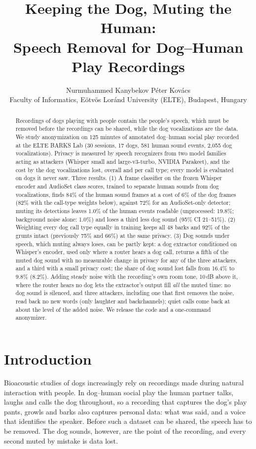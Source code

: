 \documentclass[10pt,twocolumn,a4paper]{article}
\title{Keeping the Dog, Muting the Human:\\ Speech Removal for Dog--Human Play Recordings}
\author{Nurmuhammed Kanybekov \quad Péter Kovács\\
\small Faculty of Informatics, Eötvös Loránd University (ELTE), Budapest, Hungary\\
\small \todo{draft of 23 October 2026 -- not for distribution; author list and order to be confirmed}}
\date{}
\begin{document}
\maketitle

\begin{abstract}
Recordings of dogs playing with people contain the people's speech, which must be removed before the
recordings can be shared, while the dog vocalizations are the data. We study anonymization on 125
minutes of annotated dog--human social play recorded at the ELTE BARKS Lab (30 sessions, 17 dogs, 581
human sound events, 2{,}055 dog vocalizations). Privacy is measured by speech recognizers from two model
families acting as attackers (Whisper small and large-v3-turbo, NVIDIA Parakeet), and the cost by the dog
vocalizations lost, overall and per call type; every model is evaluated on dogs it never saw. Three
results. (1) A frame classifier on the frozen Whisper encoder and AudioSet class scores, trained to
separate human sounds from dog vocalizations, finds 84\% of the human sound frames at a cost of 6\% of
the dog frames (82\% with the call-type weights below), against 72\% for an AudioSet-only detector; muting its detections leaves 1.0\% of the
human events readable (unprocessed: 19.8\%; background noise alone: 1.0\%) and loses a third less dog
sound (95\% CI 21--51\%). (2) Weighting every dog call type equally in training keeps all 48 barks and
92\% of the grunts intact (previously 75\% and 66\%) at the same privacy. (3) Dog sounds under speech,
which muting always loses, can be partly kept: a dog extractor conditioned on Whisper's encoder, used only
where a router hears a dog call, returns a fifth of the muted dog sound with no measurable change in
privacy for any of the three attackers, and a third with a small privacy cost; the share of dog sound lost
falls from 16.4\% to 9.8\% (8.2\%). Adding steady noise with the recording's own room tone, 10\,dB above it,
where the router hears no dog lets the extractor's output fill \emph{all} the muted time: no dog sound is
silenced, and three attackers, including one that first removes the noise, read back no new words (only
laughter and backchannels); quiet calls come back at about the level of the added noise. We release the
code and a one-command anonymizer.
\end{abstract}

\section{Introduction}
Bioacoustic studies of dogs increasingly rely on recordings made during natural interaction with
people. In dog--human social play the human partner talks, laughs and calls the dog throughout, so a
recording that captures the dog's play pants, growls and barks also captures personal data: what was
said, and a voice that identifies the speaker. Before such a dataset can be shared, the speech has to
be removed. The dog sounds, however, are the point of the recording, and every second muted by mistake
is data lost.
\end{document}
